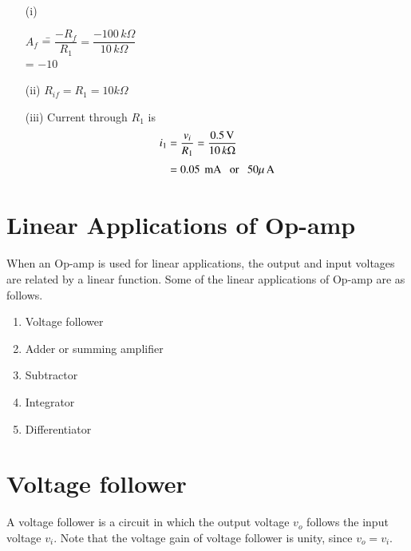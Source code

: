 \begin{solution}
~

\begin{itemize}
\item[(i)] 
\begin{tabbing}
$A_{f}$ \== $\dfrac{-R_{f}}{R_{1}}= \dfrac{-100\,k\Omega}{10\,k\Omega}$\\[4pt]
\>= $-10$
\end{tabbing}

\item[(ii)] $R_{if}=R_{1}=10 k\Omega$

\item[(iii)] Current through $R_{1}$ is
\begin{align*}
i_{1} &= \frac{v_{i}}{R_{1}}= \frac{0.5\,\text{V}}{10\,k\Omega}\\[3pt]
&= 0.05\text{\, mA~~ or~~ } 50\mu \text{\,A}
\end{align*}
\end{itemize}
\vskip -1.05cm
\end{solution}

\section{Linear Applications of Op-amp}\label{addsec5.12}

When an Op-amp is used for linear applications, the output and input voltages are related by a linear function. Some of the linear applications of Op-amp are as follows.
\begin{enumerate}
\itemsep=1pt
\item Voltage follower

\item Adder or summing amplifier 

\item Subtractor

\item Integrator

\item Differentiator
\end{enumerate}

\section{Voltage follower}\label{sec5.11}

A voltage follower is a circuit in which the output voltage $v_{o}$ follows the input voltage $v_{i}$. Note that the voltage gain of voltage follower is unity, since $v_{o}=v_{i}$.

